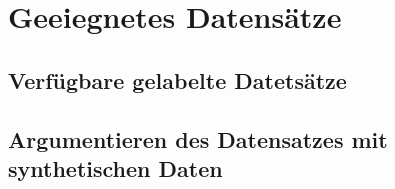 \section{Geeiegnetes Datensätze}

\subsection{Verfügbare gelabelte Datetsätze}

\subsection{Argumentieren des Datensatzes mit synthetischen Daten}